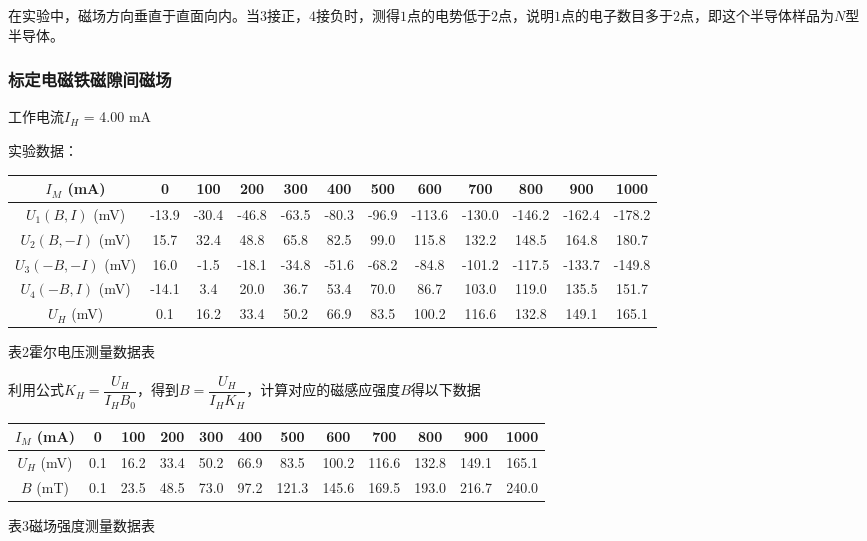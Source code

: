\documentclass[UTF8]{ctexart}
\begin{document}
在实验中，磁场方向垂直于直面向内。当$3$接正，$4$接负时，测得$1$点的电势低于$2$点，说明$1$点的电子数目多于$2$点，即这个半导体样品为$N$型半导体。

\subsubsection{标定电磁铁磁隙间磁场}

工作电流$I_H$ = 4.00 mA

实验数据：

\begin{center}
    \begin{tabular}{|c|c|c|c|c|c|c|c|c|c|c|c|}
        \hline
        $I_M$ (mA) & 0 & 100 & 200 & 300 & 400 & 500 & 600 & 700 & 800 & 900 & 1000 \\\hline
        $U_1(B,I)$ (mV) & -13.9 & -30.4 & -46.8 & -63.5 & -80.3 & -96.9 & -113.6 & -130.0 & -146.2 & -162.4 & -178.2 \\\hline
        $U_2(B,-I)$ (mV) & 15.7 & 32.4 & 48.8 & 65.8 & 82.5 & 99.0 & 115.8 & 132.2 & 148.5 & 164.8 & 180.7 \\\hline
        $U_3(-B,-I)$ (mV) & 16.0 & -1.5 & -18.1 & -34.8 & -51.6 & -68.2 & -84.8 & -101.2 & -117.5 & -133.7 & -149.8 \\\hline
        $U_4(-B,I)$ (mV) & -14.1 & 3.4 & 20.0 & 36.7 & 53.4 & 70.0 & 86.7 & 103.0 & 119.0 & 135.5 & 151.7 \\\hline
        $U_H$ (mV) & 0.1 & 16.2 & 33.4 & 50.2 & 66.9 & 83.5 & 100.2 & 116.6 & 132.8 & 149.1 & 165.1 \\\hline
    \end{tabular}
    \begin{minipage}{0.8\textwidth}
        \centering
        \fontsize{9pt}{\baselineskip}\selectfont
        表2\quad 霍尔电压测量数据表
    \end{minipage}
    \label{Hall_voltage_data}
\end{center}

利用公式$K_H=\dfrac{U_H}{I_HB_0}$，得到$B=\dfrac{U_H}{I_HK_H}$，计算对应的磁感应强度$B$得以下数据

\begin{center}
    \begin{tabular}{|c|c|c|c|c|c|c|c|c|c|c|c|}
        \hline
        $I_M$ (mA) & 0 & 100 & 200 & 300 & 400 & 500 & 600 & 700 & 800 & 900 & 1000 \\\hline
        $U_H$ (mV) & 0.1 & 16.2 & 33.4 & 50.2 & 66.9 & 83.5 & 100.2 & 116.6 & 132.8 & 149.1 & 165.1 \\\hline
        $B$ (mT) & 0.1 & 23.5 & 48.5 & 73.0 & 97.2 & 121.3 & 145.6 & 169.5 & 193.0 & 216.7 & 240.0 \\\hline
    \end{tabular}
    \begin{minipage}{0.8\textwidth}
        \centering
        \fontsize{9pt}{\baselineskip}\selectfont
        表3\quad 磁场强度测量数据表
    \end{minipage}
    \label{Magnetic_field_data}
\end{center}
\end{document}
